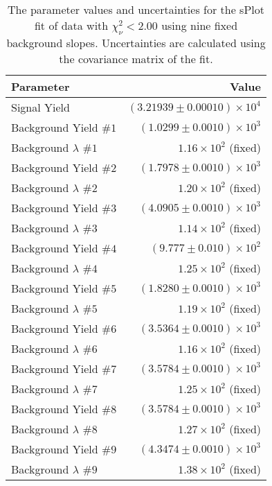 
\begin{table}[ht]
    \begin{center}
        \begin{tabular}{lr}\toprule
            Parameter & Value \\\midrule
            Signal Yield & $(3.21939 \pm 0.00010) \times 10^{4}$ \\
            Background Yield $\#1$ & $(1.0299 \pm 0.0010) \times 10^{3}$ \\
            Background $\lambda$ $\#1$ & $1.16 \times 10^{2}$ (fixed) \\
            Background Yield $\#2$ & $(1.7978 \pm 0.0010) \times 10^{3}$ \\
            Background $\lambda$ $\#2$ & $1.20 \times 10^{2}$ (fixed) \\
            Background Yield $\#3$ & $(4.0905 \pm 0.0010) \times 10^{3}$ \\
            Background $\lambda$ $\#3$ & $1.14 \times 10^{2}$ (fixed) \\
            Background Yield $\#4$ & $(9.777 \pm 0.010) \times 10^{2}$ \\
            Background $\lambda$ $\#4$ & $1.25 \times 10^{2}$ (fixed) \\
            Background Yield $\#5$ & $(1.8280 \pm 0.0010) \times 10^{3}$ \\
            Background $\lambda$ $\#5$ & $1.19 \times 10^{2}$ (fixed) \\
            Background Yield $\#6$ & $(3.5364 \pm 0.0010) \times 10^{3}$ \\
            Background $\lambda$ $\#6$ & $1.16 \times 10^{2}$ (fixed) \\
            Background Yield $\#7$ & $(3.5784 \pm 0.0010) \times 10^{3}$ \\
            Background $\lambda$ $\#7$ & $1.25 \times 10^{2}$ (fixed) \\
            Background Yield $\#8$ & $(3.5784 \pm 0.0010) \times 10^{3}$ \\
            Background $\lambda$ $\#8$ & $1.27 \times 10^{2}$ (fixed) \\
            Background Yield $\#9$ & $(4.3474 \pm 0.0010) \times 10^{3}$ \\
            Background $\lambda$ $\#9$ & $1.38 \times 10^{2}$ (fixed) \\\bottomrule
        \end{tabular}
        \caption{The parameter values and uncertainties for the sPlot fit of data with $\chi^2_\nu < 2.00$ using nine fixed background slopes. Uncertainties are calculated using the covariance matrix of the fit.}\label{tab:splot-fit-results-chisqdof-2.00-fixed-9}
    \end{center}
\end{table}
